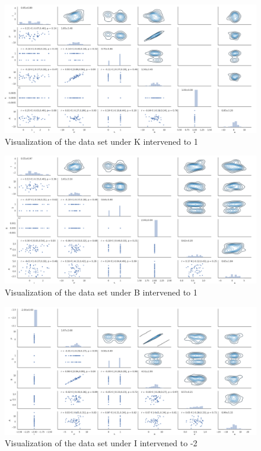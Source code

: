 \documentclass[12pt,fleqn,]{article}
\begin{document}
\begin{figure}[H]
	\centering
	\includegraphics[width=\linewidth]{interKdata}
	\caption{Visualization of the data set under K intervened to 1}
	\label{fig:interKdata}
\end{figure}
\begin{figure}[H]
	\centering
	\includegraphics[width=\linewidth]{interBdata}
	\caption{Visualization of the data set under B intervened to 1}
	\label{fig:interBdata}
\end{figure}
\begin{figure}[H]
	\centering
	\includegraphics[width=\linewidth]{interIdata}
	\caption{Visualization of the data set under I intervened to -2}
	\label{fig:interIdata}
\end{figure}
\end{document}
